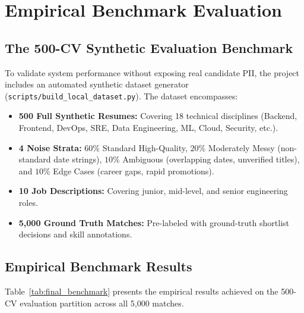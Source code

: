 \documentclass[11pt,a4paper]{report}
\begin{document}
\chapter{Empirical Benchmark Evaluation}

\section{The 500-CV Synthetic Evaluation Benchmark}
To validate system performance without exposing real candidate PII, the project includes an automated synthetic dataset generator (\texttt{scripts/build\_local\_dataset.py}). The dataset encompasses:
\begin{itemize}[leftmargin=1.5em]
    \item \textbf{500 Full Synthetic Resumes:} Covering 18 technical disciplines (Backend, Frontend, DevOps, SRE, Data Engineering, ML, Cloud, Security, etc.).
    \item \textbf{4 Noise Strata:} $60\%$ Standard High-Quality, $20\%$ Moderately Messy (non-standard date strings), $10\%$ Ambiguous (overlapping dates, unverified titles), and $10\%$ Edge Cases (career gaps, rapid promotions).
    \item \textbf{10 Job Descriptions:} Covering junior, mid-level, and senior engineering roles.
    \item \textbf{5,000 Ground Truth Matches:} Pre-labeled with ground-truth shortlist decisions and skill annotations.
\end{itemize}

\section{Empirical Benchmark Results}
Table~\ref{tab:final_benchmark} presents the empirical results achieved on the 500-CV evaluation partition across all 5,000 matches.
\end{document}
